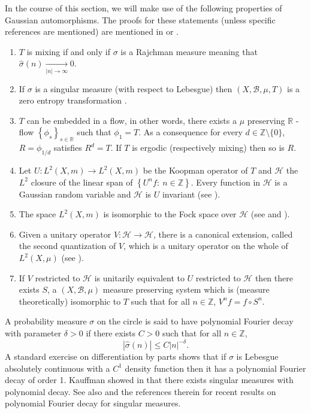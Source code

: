 \documentclass[12pt,reqno]{amsart}
\newcommand{\Z}{\mathbb{Z}}
\newcommand{\R}{\mathbb{R}}
\newcommand{\B}{\mathcal{B}}
\theoremstyle{definition}
\begin{document}
In the course of this section, we will make use of the following properties of Gaussian automorphisms. The proofs for these statements (unless specific references are mentioned) are mentioned in \cite{MR832433} or \cite{Janvresse_Roy_DeLaRue_2023}. 
\begin{enumerate}[label=(\alph*)]
    \item $T$ is mixing if and only if $\sigma$ is a Rajchman measure meaning that $\hat{\sigma}(n)\xrightarrow[|n|\to\infty]{}0$.
    \item If $\sigma$ is a singular measure (with respect to Lebesgue) then $(X,\B,\mu,T)$ is a zero entropy transformation \cite{MR191718,MR1231420}.
    \item $T$ can be embedded in a flow, in other words, there exists a $\mu$ preserving $\R$ - flow $\left\{\phi_s\right\}_{s\in\R}$ such that $\phi_1=T$. As a consequence for every $d\in \Z\setminus\{0\}$,  $R=\phi_{1/d}$ satisfies $R^d=T$. If $T$ is ergodic (respectively mixing) then so is $R$. 
    \item Let $U:L^2(X,m)\to L^2(X,m)$ be the Koopman  operator of $T$ and $\mathcal{H}$  the $L^2$ closure of the linear span of $\left\{U^nf:\ n\in\Z\right\}$. Every function in $\mathcal{H}$ is a Gaussian random variable and $\mathcal{H}$ is $U$ invariant (see \cite[Appendix B-D]{Kechris_2010}). 
    \item The space $L^2(X,m)$ is isomorphic to the Fock space over $\mathcal{H}$ (see \cite[Section 4.2 and 4.3]{Janvresse_Roy_DeLaRue_2023} and \cite[Appendix B-D]{Kechris_2010}). 
    \item Given a unitary operator $V: \mathcal{H}\to\mathcal{H}$, there is a canonical extension, called the second quantization of $V$, which is a unitary operator on the whole of $L^2(X,\mu)$ (see \cite[Proposition 4.1]{Janvresse_Roy_DeLaRue_2023}).
    \item If $V$ restricted to $\mathcal{H}$ is unitarily equivalent to $U$ restricted to $\mathcal{H}$ then there exists $S$, a $(X,\B,\mu)$ measure preserving system which is (measure theoretically) isomorphic to $T$ such that for all $n\in \Z$, $V^nf=f\circ S^n$. 
\end{enumerate}
A probability measure $\sigma$ on the circle is said to have polynomial Fourier decay with parameter $\delta>0$ if there exists $C>0$ such that for all $n\in\Z$,
\[
\left|\hat{\sigma}(n)\right|\leq C|n|^{-\delta}. 
\]
A standard exercise on differentiation by parts shows that if $\sigma$ is Lebesgue absolutely continuous with a $C^1$ density function then it has a polynomial Fourier decay of order 1. Kauffman showed in \cite{Kaufman_1980} that there exists singular measures with polynomial decay. See also \cite{MR3466857, 2023arXiv230601275A,MR4887758} and the references therein for recent results on polynomial Fourier decay for singular measures. 
\end{document}
